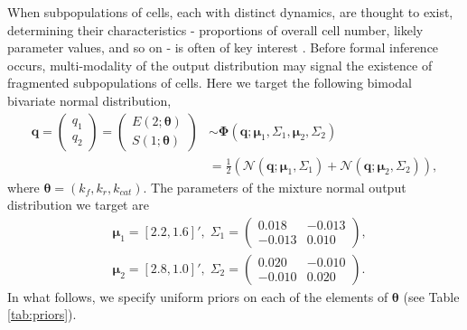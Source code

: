 When subpopulations of cells, each with distinct dynamics, are thought to exist, determining their characteristics - proportions of overall cell number, likely parameter values, and so on - is often of key interest \cite{hasenauer2011identification,loos2018hierarchical}. Before formal inference occurs, multi-modality of the output distribution may signal the existence of fragmented subpopulations of cells. Here we target the following bimodal bivariate normal distribution,
%
\begin{align}
\boldsymbol{q} = \begin{pmatrix} q_1 \\ q_2 \end{pmatrix}
 = \begin{pmatrix} E(2; \boldsymbol{\theta}) \\ S(1; \boldsymbol{\theta}) \end{pmatrix}
&  \sim
\boldsymbol{\Phi}(\boldsymbol{q}; \boldsymbol{\mu}_1,\Sigma_1, \boldsymbol{\mu}_2, \Sigma_2) \\
&= \frac{1}{2}\left(\mathcal{N}(\boldsymbol{q}; \boldsymbol{\mu}_1,\Sigma_1)
+ \mathcal{N}(\boldsymbol{q}; \boldsymbol{\mu}_2,\Sigma_2)\right),
\end{align}
%
where $\boldsymbol{\theta}=(k_f,k_r,k_{cat})$. The parameters of the mixture normal output distribution we target are
\begin{equation*}
\begin{aligned}
&\boldsymbol{\mu}_1=[2.2, 1.6]', \; \Sigma_1 = \begin{pmatrix}0.018 & -0.013 \\ -0.013 & 0.010 \end{pmatrix}, \\
&\boldsymbol{\mu}_2=[2.8, 1.0]', \; \Sigma_2 = \begin{pmatrix}0.020 & -0.010 \\ -0.010 & 0.020 \end{pmatrix}.
\end{aligned}
\end{equation*}
In what follows, we specify uniform priors on each of the elements of $\boldsymbol{\theta}$ (see Table \ref{tab:priors}).


